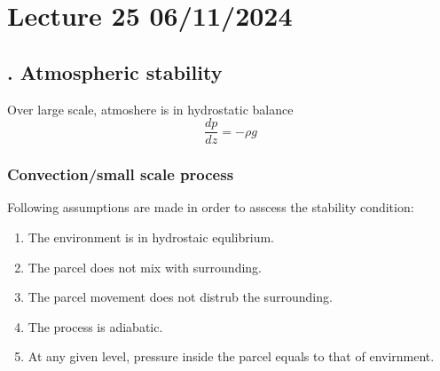 \documentclass[fleqn,10pt]{SelfArx} %
\begin{document}
\section{Lecture 25 06/11/2024}

\subsection{. Atmospheric stability}
Over large scale, atmoshere is in hydrostatic balance
\begin{equation}
    \frac{dp}{dz} = -\rho g
    \label{eq:hyfrostatic_eq}
\end{equation}

\subsubsection*{Convection/small scale process}
Following assumptions are made in order to asscess the stability condition:
\begin{enumerate}[noitemsep]
    \item The environment is in hydrostaic equlibrium.
    \item The parcel does not mix with surrounding.
    \item The parcel movement does not distrub the surrounding.
    \item The process is adiabatic.
    \item At any given level, pressure inside the parcel equals to that of envirnment. \label{assumption5}
\end{enumerate}
\end{document}
